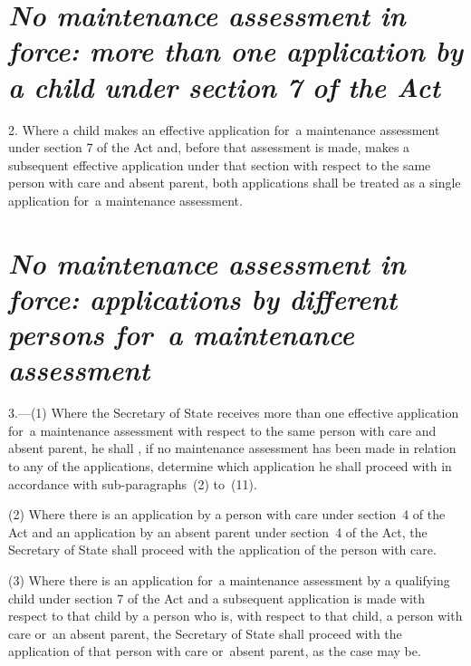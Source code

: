 \documentclass[a4paper,12pt]{article}
\begin{document}
\section*{\itshape No maintenance assessment in force: more than one application by a child under section 7 of the Act}

2.  Where a child makes an effective application for~a maintenance assessment under section 7 of the Act and, before that assessment is made, makes a subsequent effective application under that section with respect to the same person with care and absent parent, both applications shall be treated as a single application for~a maintenance assessment.

\section*{\itshape No maintenance assessment in force: applications by different persons for~a maintenance assessment}

3.—(1) Where the Secretary of State receives more than one effective application for~a maintenance assessment with respect to the same person with care and absent parent, he shall%
, if no maintenance assessment has been made in relation to any of the applications,  %
determine which application he shall proceed with in accordance with sub-paragraphs~(2) to~(11).

(2) Where there is an application by a person with care under section~4 
of the Act and an application by an absent parent under section~4 of the Act, 
the Secretary of State  %
shall proceed with the application of the person with care.

(3) Where there is an application for~a maintenance assessment by a qualifying child under section 7 of the Act and a subsequent application is made with respect to that child by a person who is, with respect to that child, a person with care or~an absent parent, 
the Secretary of State  %
shall proceed with the application of that person with care or~absent parent, as the case may be.
\end{document}
